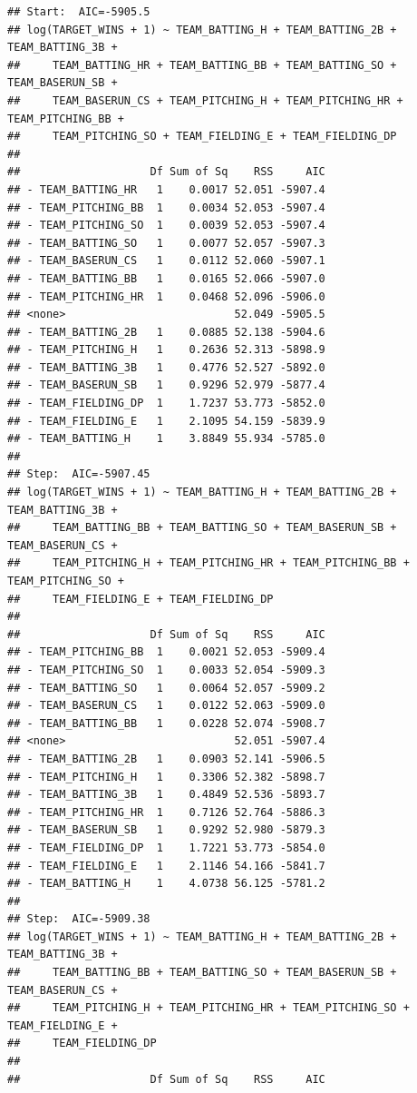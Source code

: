 \documentclass[
]{article}
\begin{document}
\begin{verbatim}
## Start:  AIC=-5905.5
## log(TARGET_WINS + 1) ~ TEAM_BATTING_H + TEAM_BATTING_2B + TEAM_BATTING_3B + 
##     TEAM_BATTING_HR + TEAM_BATTING_BB + TEAM_BATTING_SO + TEAM_BASERUN_SB + 
##     TEAM_BASERUN_CS + TEAM_PITCHING_H + TEAM_PITCHING_HR + TEAM_PITCHING_BB + 
##     TEAM_PITCHING_SO + TEAM_FIELDING_E + TEAM_FIELDING_DP
## 
##                    Df Sum of Sq    RSS     AIC
## - TEAM_BATTING_HR   1    0.0017 52.051 -5907.4
## - TEAM_PITCHING_BB  1    0.0034 52.053 -5907.4
## - TEAM_PITCHING_SO  1    0.0039 52.053 -5907.4
## - TEAM_BATTING_SO   1    0.0077 52.057 -5907.3
## - TEAM_BASERUN_CS   1    0.0112 52.060 -5907.1
## - TEAM_BATTING_BB   1    0.0165 52.066 -5907.0
## - TEAM_PITCHING_HR  1    0.0468 52.096 -5906.0
## <none>                          52.049 -5905.5
## - TEAM_BATTING_2B   1    0.0885 52.138 -5904.6
## - TEAM_PITCHING_H   1    0.2636 52.313 -5898.9
## - TEAM_BATTING_3B   1    0.4776 52.527 -5892.0
## - TEAM_BASERUN_SB   1    0.9296 52.979 -5877.4
## - TEAM_FIELDING_DP  1    1.7237 53.773 -5852.0
## - TEAM_FIELDING_E   1    2.1095 54.159 -5839.9
## - TEAM_BATTING_H    1    3.8849 55.934 -5785.0
## 
## Step:  AIC=-5907.45
## log(TARGET_WINS + 1) ~ TEAM_BATTING_H + TEAM_BATTING_2B + TEAM_BATTING_3B + 
##     TEAM_BATTING_BB + TEAM_BATTING_SO + TEAM_BASERUN_SB + TEAM_BASERUN_CS + 
##     TEAM_PITCHING_H + TEAM_PITCHING_HR + TEAM_PITCHING_BB + TEAM_PITCHING_SO + 
##     TEAM_FIELDING_E + TEAM_FIELDING_DP
## 
##                    Df Sum of Sq    RSS     AIC
## - TEAM_PITCHING_BB  1    0.0021 52.053 -5909.4
## - TEAM_PITCHING_SO  1    0.0033 52.054 -5909.3
## - TEAM_BATTING_SO   1    0.0064 52.057 -5909.2
## - TEAM_BASERUN_CS   1    0.0122 52.063 -5909.0
## - TEAM_BATTING_BB   1    0.0228 52.074 -5908.7
## <none>                          52.051 -5907.4
## - TEAM_BATTING_2B   1    0.0903 52.141 -5906.5
## - TEAM_PITCHING_H   1    0.3306 52.382 -5898.7
## - TEAM_BATTING_3B   1    0.4849 52.536 -5893.7
## - TEAM_PITCHING_HR  1    0.7126 52.764 -5886.3
## - TEAM_BASERUN_SB   1    0.9292 52.980 -5879.3
## - TEAM_FIELDING_DP  1    1.7221 53.773 -5854.0
## - TEAM_FIELDING_E   1    2.1146 54.166 -5841.7
## - TEAM_BATTING_H    1    4.0738 56.125 -5781.2
## 
## Step:  AIC=-5909.38
## log(TARGET_WINS + 1) ~ TEAM_BATTING_H + TEAM_BATTING_2B + TEAM_BATTING_3B + 
##     TEAM_BATTING_BB + TEAM_BATTING_SO + TEAM_BASERUN_SB + TEAM_BASERUN_CS + 
##     TEAM_PITCHING_H + TEAM_PITCHING_HR + TEAM_PITCHING_SO + TEAM_FIELDING_E + 
##     TEAM_FIELDING_DP
## 
##                    Df Sum of Sq    RSS     AIC

\end{verbatim}
\end{document}
